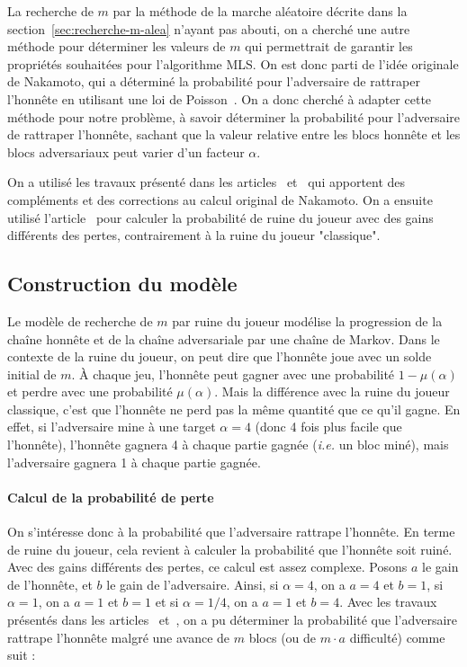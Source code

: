 	La recherche de $m$ par la méthode de la marche aléatoire décrite dans la
	section~\ref{sec:recherche-m-alea} n'ayant pas abouti, on a cherché une autre
	méthode pour déterminer les valeurs de $m$ qui permettrait de garantir les
	propriétés souhaitées pour l'algorithme MLS. On est donc parti de l'idée
	originale de Nakamoto, qui a déterminé la probabilité pour l'adversaire de
	rattraper l'honnête en utilisant une loi de Poisson~\cite{bitcoin}. On a donc
	cherché à adapter cette méthode pour notre problème, à savoir déterminer la
	probabilité pour l'adversaire de rattraper l'honnête, sachant que la valeur
	relative entre les blocs honnête et les blocs adversariaux peut varier d'un
	facteur $\alpha$.

	On a utilisé les travaux présenté dans les articles~\cite{rosenfeld}
	et~\cite{double-spend} qui apportent des compléments et des corrections au
	calcul original de Nakamoto. On a ensuite utilisé l'article~\cite{gamblers}
	pour calculer la probabilité de ruine du joueur avec des gains différents des
	pertes, contrairement à la ruine du joueur "classique".


	\subsection{Construction du modèle}\label{subsec:ruin-construction-modele}

	Le modèle de recherche de $m$ par ruine du joueur modélise la progression de
	la chaîne honnête et de la chaîne adversariale par une chaîne de Markov. Dans
	le contexte de la ruine du joueur, on peut dire que l'honnête joue avec un
	solde initial de $m$. À chaque jeu, l'honnête peut gagner avec une probabilité
	$1-\mu(\alpha)$ et perdre avec une probabilité $\mu(\alpha)$. Mais la
	différence avec la ruine du joueur classique, c'est que l'honnête ne perd pas
	la même quantité que ce qu'il gagne. En effet, si l'adversaire mine à une
	target $\alpha = 4$ (donc 4 fois plus facile que l'honnête), l'honnête gagnera
	4 à chaque partie gagnée (\emph{i.e.} un bloc miné), mais l'adversaire gagnera 1 à
	chaque partie gagnée.

	
	\paragraph{Calcul de la probabilité de perte} On s'intéresse donc à la
	probabilité que l'adversaire rattrape l'honnête. En terme de ruine du joueur,
	cela revient à calculer la probabilité que l'honnête soit ruiné. Avec des
	gains différents des pertes, ce calcul est assez complexe. Posons $a$ le gain
	de l'honnête, et $b$ le gain de l'adversaire. Ainsi, si $\alpha = 4$, on a $a
	= 4$ et $b = 1$, si $\alpha = 1$, on a $a = 1$ et $b = 1$ et si $\alpha =
	1/4$, on a $a = 1$ et $b = 4$. Avec les travaux présentés dans les
	articles~\cite{rosenfeld} et~\cite{double-spend}, on a pu déterminer la
	probabilité que l'adversaire rattrape l'honnête malgré une avance de $m$ blocs
	(ou de $m\cdot a$ difficulté) comme suit :

